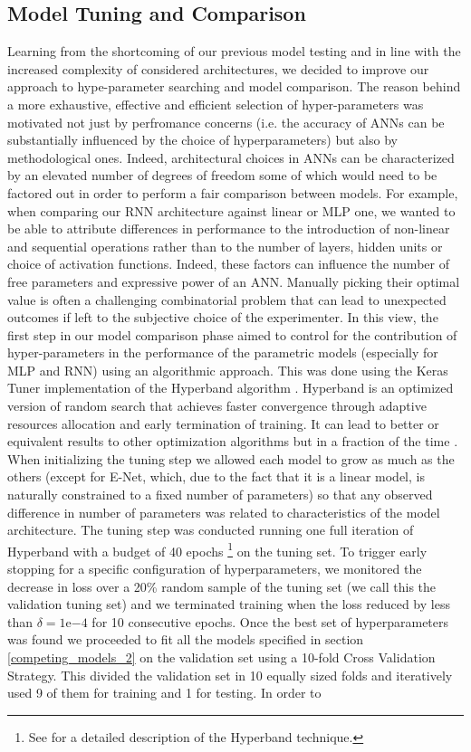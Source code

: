 \subsection{Model Tuning and Comparison}
\label{tuning_comparison_2}
Learning from the shortcoming of our previous model testing and in line with the increased complexity of considered architectures, we decided to improve our approach to hype-parameter searching and model comparison. The reason behind a more exhaustive, effective and efficient selection of hyper-parameters was motivated not just by perfromance concerns (i.e. the accuracy of ANNs can be substantially influenced by the choice of hyperparameters) but also by methodological ones. Indeed, architectural choices in ANNs can be characterized by an elevated number of degrees of freedom some of which would need to be factored out in order to perform a fair comparison between models. For example, when comparing our RNN architecture against linear or MLP one, we wanted to be able to attribute differences in performance to the introduction of non-linear and sequential operations rather than to the number of layers, hidden units or choice of activation functions. Indeed, these factors can influence the number of free parameters and expressive power of an ANN. Manually picking their optimal value is often a challenging combinatorial problem that can lead to unexpected outcomes if left to the subjective choice of the experimenter. In this view, the first step in our model comparison phase aimed to control for the contribution of hyper-parameters in the performance of the parametric models (especially for MLP and RNN) using an algorithmic approach. This was done using the Keras Tuner implementation \cite{omalley2019kerastuner} of the Hyperband algorithm \cite{li2017hyperband}. Hyperband is an optimized version of random search that achieves faster convergence through adaptive resources allocation and early termination of training. It can lead to better or equivalent results to other optimization algorithms but in a fraction of the time \cite{li2017hyperband}. When initializing the tuning step we allowed each model to grow as much as the others (except for E-Net, which,  due to the fact that it is a linear model, is naturally constrained to a fixed number of parameters) so that any observed difference in number of parameters was related to characteristics of the model architecture. The tuning step was conducted running one full iteration of Hyperband with a budget of 40 epochs \footnote{See  \cite{li2017hyperband,hyperwebs} for a detailed description of the Hyperband technique.} on the tuning set. To trigger early stopping for a specific configuration of hyperparameters, we monitored the decrease in loss over a 20\% random sample of the tuning set (we call this the validation tuning set) and we terminated training when the loss reduced by less than $\delta = 1\mathrm{e}{-4}$ for 10 consecutive epochs. Once the best set of hyperparameters was found we proceeded to fit all the models specified in section \ref{competing_models_2} on the validation set using a 10-fold Cross Validation Strategy. This  divided the validation set in 10 equally sized folds and iteratively used 9 of them for training and 1 for testing. In order to 